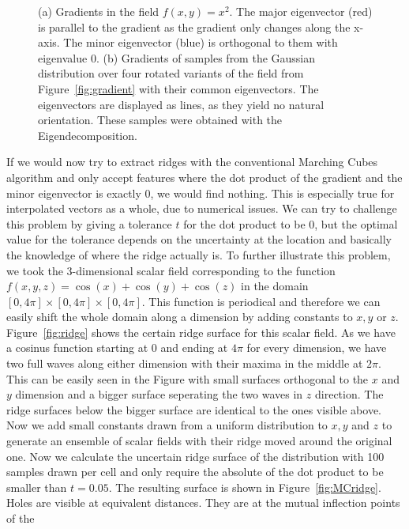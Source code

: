 \begin{figure}
\begin{subfigure}[b]{0.49\textwidth}
        \caption{}
        \label{fig:samples}
    \end{subfigure}
    \caption{(a) Gradients in the field $f(x,y)=x^2$. The major
    eigenvector (red) is parallel to the gradient as the gradient only
    changes along the x-axis. The minor eigenvector (blue) is orthogonal
    to them with eigenvalue 0. (b) Gradients of samples from the
    Gaussian distribution over four rotated variants of the field from
    Figure~\ref{fig:gradient} with their common eigenvectors. The
    eigenvectors are displayed as lines, as they yield no natural
    orientation. These samples were obtained with the
    Eigendecomposition.}
    \label{fig:sampComp}
\end{figure}
If we would now try to extract ridges with the conventional
Marching Cubes algorithm and only accept features where the dot product
of the gradient and the minor eigenvector is exactly 0, we would find
nothing. This is especially true for interpolated vectors as a whole,
due to numerical issues. We can try to challenge this problem by giving
a tolerance $t$ for the dot product to be 0, but the optimal value for the
tolerance depends on the uncertainty at the location and basically the
knowledge of where the ridge actually is. To further illustrate this
problem, we took the 3-dimensional scalar field corresponding to the
function $f(x,y,z) = \cos{(x)} + \cos{(y)} + \cos{(z)}$ in the domain
$[0, 4 \pi] \times [0, 4\pi] \times [0, 4\pi]$. This function is
periodical and therefore we can easily shift the whole domain along a
dimension by adding constants to $x, y$ or $z$. Figure~\ref{fig:ridge}
shows the certain ridge surface for this scalar field. As we have a
cosinus function starting at 0 and ending at $4\pi$ for every dimension,
we have two full waves along either dimension with their maxima in the
middle at $2\pi$. This can be easily seen in the Figure with small
surfaces orthogonal to the $x$ and $y$ dimension and a bigger surface
seperating the two waves in $z$ direction. The ridge surfaces below the
bigger surface are identical to the ones visible above. Now we add small
constants drawn from a uniform distribution to $x, y$ and $z$ to
generate an ensemble of scalar fields with their ridge moved around the
original one. Now we calculate the uncertain ridge surface of the
distribution with 100 samples drawn per cell and only require the
absolute of the dot product to be smaller than $t=0.05$. The resulting
surface is shown in Figure~\ref{fig:MCridge}. Holes are visible at
equivalent distances. They are at the mutual inflection points of the
